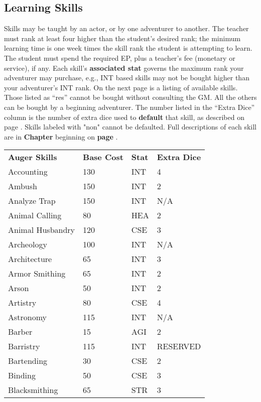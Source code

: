 \begin{multicols*}{2}
\subsection{Learning Skills}
Skills may be taught by an actor, or by one adventurer to another. The teacher must rank at least four higher than the student’s desired rank; the minimum learning time is one week times the skill rank the student is attempting to learn. The student must spend the required EP, plus a teacher’s fee (monetary or service), if any.
Each skill’s \textbf{associated stat} governs the maximum rank your adventurer may purchase, e.g., INT based skills may not be bought higher than your adventurer’s INT rank.
On the next page is a listing of available skills. Those listed as “res” cannot be bought without consulting the GM. All the others can be bought by a beginning adventurer. The number listed in the “Extra Dice” column is the number of extra dice used to \textbf{default} that skill, as described on page \textbf{\pageref{create-skills-list}}. Skills labeled with "non" cannot be defaulted. Full descriptions of each skill are in \textbf{Chapter } beginning on \textbf{page \pageref{ch:skills}}.
\label{create-skills-list}
\begin{tcolorbox}[breakable,boxrule=0pt]
\begin{xtabular}{l l l l}
\textbf{Auger Skills} & \textbf{Base Cost} & \textbf{Stat} & \textbf{Extra Dice}\\
Accounting & 130 & INT & 4 \\
Ambush & 150 & INT & 2 \\
Analyze Trap & 150 & INT & N/A \\
Animal Calling & 80 & HEA & 2 \\
Animal Husbandry & 120 & CSE & 3 \\
Archeology & 100 & INT & N/A \\
Architecture & 65 & INT & 3 \\
Armor Smithing & 65 & INT & 2 \\
Arson & 50 & INT & 2 \\
Artistry & 80 & CSE & 4 \\
Astronomy & 115 & INT & N/A \\
Barber & 15 & AGI & 2 \\
Barristry & 115 & INT & RESERVED \\
Bartending & 30 & CSE & 2 \\
Binding & 50 & CSE & 3 \\
Blacksmithing & 65 & STR & 3 \\

\end{xtabular}
\end{tcolorbox}
\end{multicols*}
